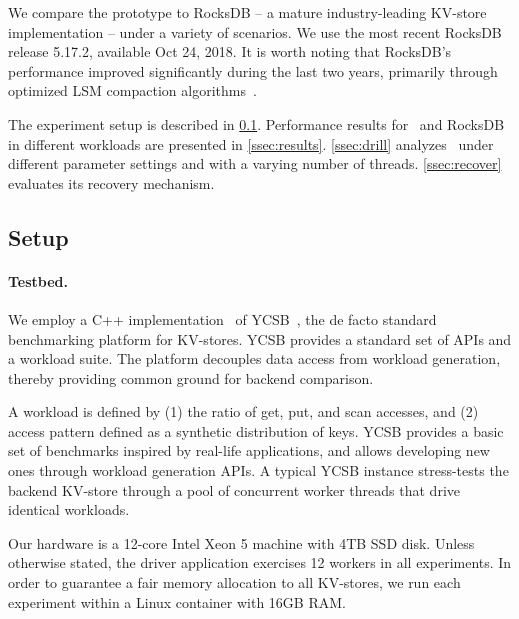 We  compare the \sys\/ prototype to RocksDB -- a mature industry-leading KV-store implementation  -- under a variety of scenarios.  We use the most recent RocksDB release 5.17.2, available Oct 24, 2018.  
It is worth noting that RocksDB's performance improved significantly during the last two years, primarily through 
optimized LSM compaction algorithms~\cite{CallaghanCompaction}.   

The experiment setup is described in \cref{ssec:setup}. 
Performance results for \sys\ and RocksDB in 
different workloads are presented in \cref{ssec:results}. 
\cref{ssec:drill} analyzes \sys\ under different parameter settings and with a varying number of threads.
\cref{ssec:recover} evaluates its recovery mechanism. 
 

\subsection{Setup}
\label{ssec:setup} 

\paragraph{Testbed.} We employ a C++ implementation~\cite{Cpp-YCSB} of YCSB~\cite{YCSB}, the  de facto standard  
benchmarking platform for KV-stores. 
YCSB provides a standard set of APIs and a workload suite. 
The platform decouples data access from workload generation, 
thereby providing common ground for backend comparison. 

A workload is defined by  (1) the ratio of get, put, and scan accesses, and (2) access pattern defined as a synthetic distribution of keys. 
YCSB provides a basic set of benchmarks  inspired by real-life applications, and allows developing new ones through workload 
generation APIs. A typical YCSB instance stress-tests the backend KV-store through a pool of concurrent worker threads that drive identical
workloads. %

Our hardware is a 12-core Intel Xeon 5 machine with 4TB SSD disk. Unless otherwise stated, the driver application 
exercises 12 workers in all experiments. In order to guarantee a fair memory allocation to all KV-stores, we run each 
experiment within a Linux container with 16GB RAM. 

